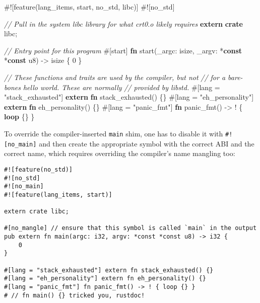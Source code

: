 \documentclass[a4paper,]{book}
\newenvironment{Shaded}{\begin{snugshade}}{\end{snugshade}}
\newcommand{\KeywordTok}[1]{\textcolor[rgb]{0.13,0.29,0.53}{\textbf{{#1}}}}
\newcommand{\DataTypeTok}[1]{\textcolor[rgb]{0.13,0.29,0.53}{{#1}}}
\newcommand{\DecValTok}[1]{\textcolor[rgb]{0.00,0.00,0.81}{{#1}}}
\newcommand{\StringTok}[1]{\textcolor[rgb]{0.31,0.60,0.02}{{#1}}}
\newcommand{\CommentTok}[1]{\textcolor[rgb]{0.56,0.35,0.01}{\textit{{#1}}}}
\newcommand{\AttributeTok}[1]{\textcolor[rgb]{0.77,0.63,0.00}{{#1}}}
\newcommand{\NormalTok}[1]{{#1}}
\begin{document}
\begin{Shaded}
\begin{Highlighting}[]
\AttributeTok{#![}\NormalTok{feature}\AttributeTok{(}\NormalTok{lang_items}\AttributeTok{,} \NormalTok{start}\AttributeTok{,} \NormalTok{no_std}\AttributeTok{,} \NormalTok{libc}\AttributeTok{)]}
\AttributeTok{#![}\NormalTok{no_std}\AttributeTok{]}

\CommentTok{// Pull in the system libc library for what crt0.o likely requires}
\KeywordTok{extern} \KeywordTok{crate} \NormalTok{libc;}

\CommentTok{// Entry point for this program}
\AttributeTok{#[}\NormalTok{start}\AttributeTok{]}
\KeywordTok{fn} \NormalTok{start(_argc: }\DataTypeTok{isize}\NormalTok{, _argv: *}\KeywordTok{const} \NormalTok{*}\KeywordTok{const} \DataTypeTok{u8}\NormalTok{) -> }\DataTypeTok{isize} \NormalTok{\{}
    \DecValTok{0}
\NormalTok{\}}

\CommentTok{// These functions and traits are used by the compiler, but not}
\CommentTok{// for a bare-bones hello world. These are normally}
\CommentTok{// provided by libstd.}
\AttributeTok{#[}\NormalTok{lang }\AttributeTok{=} \StringTok{"stack_exhausted"}\AttributeTok{]} \KeywordTok{extern} \KeywordTok{fn} \NormalTok{stack_exhausted() \{\}}
\AttributeTok{#[}\NormalTok{lang }\AttributeTok{=} \StringTok{"eh_personality"}\AttributeTok{]} \KeywordTok{extern} \KeywordTok{fn} \NormalTok{eh_personality() \{\}}
\AttributeTok{#[}\NormalTok{lang }\AttributeTok{=} \StringTok{"panic_fmt"}\AttributeTok{]} \KeywordTok{fn} \NormalTok{panic_fmt() -> ! \{ }\KeywordTok{loop} \NormalTok{\{\} \}}
\end{Highlighting}
\end{Shaded}

To override the compiler-inserted \texttt{main} shim, one has to disable
it with \texttt{\#!{[}no\_main{]}} and then create the appropriate
symbol with the correct ABI and the correct name, which requires
overriding the compiler's name mangling too:

\begin{verbatim}
#![feature(no_std)]
#![no_std]
#![no_main]
#![feature(lang_items, start)]

extern crate libc;

#[no_mangle] // ensure that this symbol is called `main` in the output
pub extern fn main(argc: i32, argv: *const *const u8) -> i32 {
    0
}

#[lang = "stack_exhausted"] extern fn stack_exhausted() {}
#[lang = "eh_personality"] extern fn eh_personality() {}
#[lang = "panic_fmt"] fn panic_fmt() -> ! { loop {} }
# // fn main() {} tricked you, rustdoc!
\end{verbatim}
\end{document}
